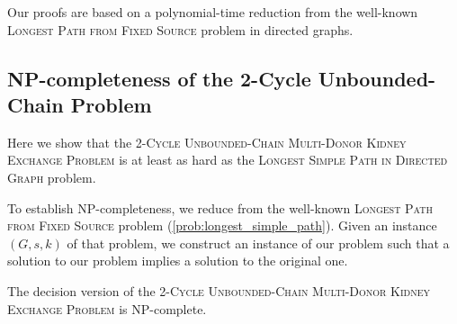Our proofs are based on a polynomial-time reduction from the well-known \textsc{Longest Path from Fixed Source} problem in directed graphs.

\subsection{NP-completeness of the 2-Cycle Unbounded-Chain Problem}

Here we show that the \textsc{2-Cycle Unbounded-Chain Multi-Donor Kidney Exchange Problem} is at least as hard as the \textsc{Longest Simple Path in Directed Graph} problem.

To establish NP-completeness, we reduce from the well-known \textsc{Longest Path from Fixed Source} problem (\autoref{prob:longest_simple_path}). Given an instance $(G, s, k)$ of that problem, we construct an instance of our problem such that a solution to our problem implies a solution to the original one.

\begin{lemma}
The decision version of the \textsc{2-Cycle Unbounded-Chain Multi-Donor Kidney Exchange Problem} is NP-complete.
\end{lemma}

